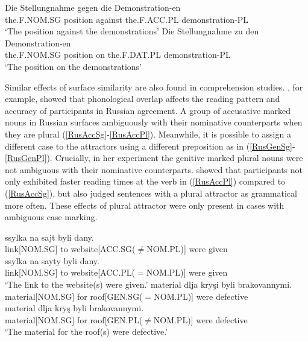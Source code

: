 \documentclass[
  authoryear,
  3p]{elsarticle}
\begin{document}
\begin{exe}
\ex \label{ger}
\begin{xlist}
\ex \label{ger-amb}
\gll Die Stellungnahme gegen die Demonstration-en\\
the.F.NOM.SG position against the.F.ACC.PL demonstration-PL\\
\glt `The position against the demonstrations'
\ex \label{ger-dist}
\gll Die Stellungnahme zu den Demonstration-en\\
the.F.NOM.SG position on the.F.DAT.PL demonstration-PL\\
\glt `The position on the demonstrations'
\end{xlist}
\end{exe}

Similar effects of surface similarity are also found in comprehension
studies. \citet{Slioussar2018}, for example, showed that phonological
overlap affects the reading pattern and accuracy of participants in
Russian agreement. A group of accusative marked nouns in Russian
surfaces ambiguously with their nominative counterparts when they are
plural (\ref{RusAccSg}-\ref{RusAccPl}). Meanwhile, it is possible to
assign a different case to the attractors using a different preposition
as in (\ref{RusGenSg}-\ref{RusGenPl}). Crucially, in her experiment the
genitive marked plural nouns were not ambiguous with their nominative
counterparts. \citet{Slioussar2018} showed that participants not only
exhibited faster reading times at the verb in (\ref{RusAccPl}) compared
to (\ref{RusAccSg}), but also judged sentences with a plural attractor
as grammatical more often. These effects of plural attractor were only
present in cases with ambiguous case marking.

\begin{exe}
\ex
\begin{xlist}
\ex \label{RusAccSg}
\gll ssylka na sajt byli dany.\\
link[NOM.SG] to {website[ACC.SG($\neq$NOM.PL)]} were given\\
\ex \label{RusAccPl}
\gll ssylka na sayty byli dany.\\
link[NOM.SG] to {website[ACC.PL($=$NOM.PL)]} were given\\
\glt `The link to the website(s) were given.'
\ex \label{RusGenSg}
\gll material dlja kry\c{s}i byli brakovannymi.\\
material[NOM.SG] for {roof[GEN.SG($=$NOM.PL)]} were defective\\
\ex \label{RusGenPl}
\gll material dlja kry\c{s} byli brakovannymi.\\
material[NOM.SG] for {roof[GEN.PL($\neq$NOM.PL)]} were defective\\
\glt `The material for the roof(s) were defective.'
\end{xlist}
\end{exe}
\end{document}
